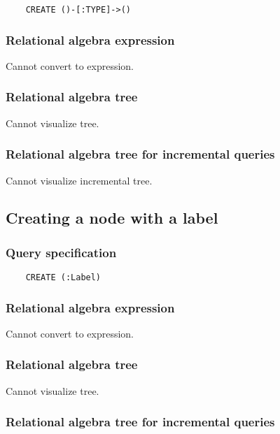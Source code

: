 	\begin{lstlisting}
	CREATE ()-[:TYPE]->()
	\end{lstlisting}


	\subsubsection*{Relational algebra expression}

	Cannot convert to expression.

	\subsubsection*{Relational algebra tree}

	Cannot visualize tree.

	\subsubsection*{Relational algebra tree for incremental queries}

	Cannot visualize incremental tree.
	\subsection{Creating a node with a label}

	\subsubsection*{Query specification}

	\begin{lstlisting}
	CREATE (:Label)
	\end{lstlisting}


	\subsubsection*{Relational algebra expression}

	Cannot convert to expression.

	\subsubsection*{Relational algebra tree}

	Cannot visualize tree.

	\subsubsection*{Relational algebra tree for incremental queries}

